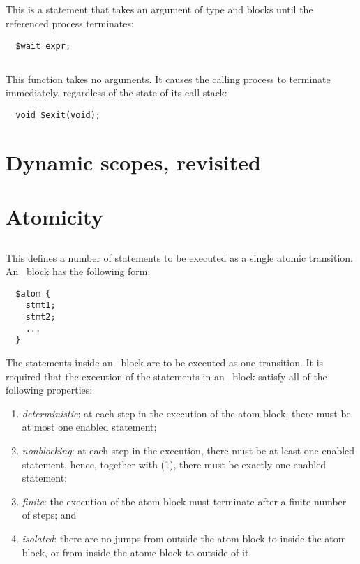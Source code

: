 \subsection{\cwait} This is a statement that takes an argument of type
\cproc{} and blocks until the referenced process terminates:
\begin{verbatim}
  $wait expr;
\end{verbatim}


\subsection{\cexit} This function takes no arguments.  It causes the
calling process to terminate immediately, regardless of the state of
its call stack:
\begin{verbatim}
  void $exit(void);
\end{verbatim}

\section{Dynamic scopes, revisited}

\section{Atomicity}

\subsection{\catom} This defines a number of statements to be executed
as a single atomic transition.  An \catom~block has the following
form:
\begin{verbatim}
  $atom {
    stmt1;
    stmt2;
    ...
  }
\end{verbatim}

The statements inside an \catom\ block are to be executed as one
transition. It is required that the execution of the statements in an
\catom\ block satisfy all of the following properties:
\begin{enumerate}
\item \emph{deterministic}: at each step in the execution of the atom
  block, there must be at most one enabled statement;
\item \emph{nonblocking}: at each step in the execution, there must be
  at least one enabled statement, hence, together with (1), there must
  be exactly one enabled statement;
\item \emph{finite}: the execution of the atom block must terminate
  after a finite number of steps; and
\item \emph{isolated}: there are no jumps from outside the atom block
  to inside the atom block, or from inside the atomc block to outside
  of it.
\end{enumerate}


